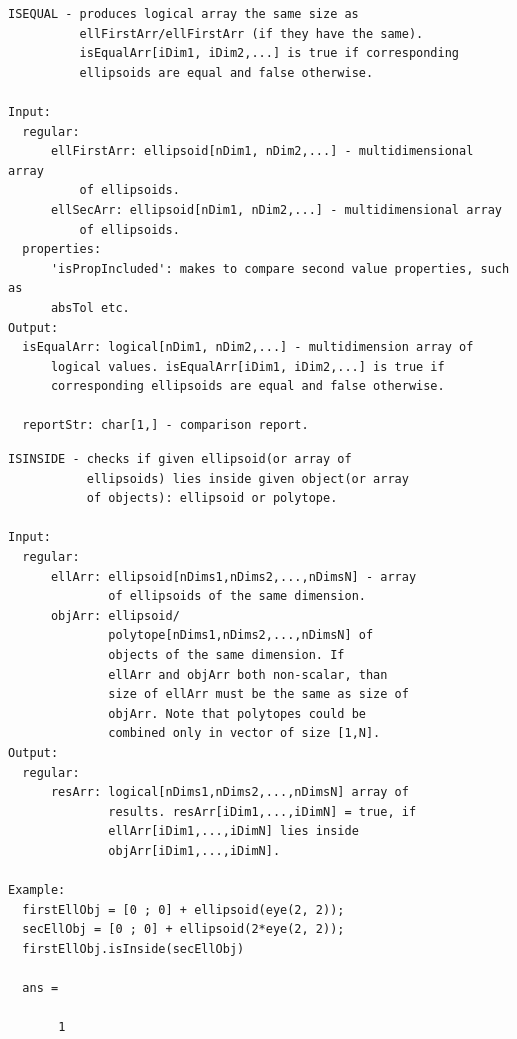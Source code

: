 \documentclass[letterpaper,10pt,english]{sphinxmanual}
\begin{document}
\begin{Verbatim}[commandchars=\\\{\}]
ISEQUAL - produces logical array the same size as
          ellFirstArr/ellFirstArr (if they have the same).
          isEqualArr[iDim1, iDim2,...] is true if corresponding
          ellipsoids are equal and false otherwise.

Input:
  regular:
      ellFirstArr: ellipsoid[nDim1, nDim2,...] - multidimensional array
          of ellipsoids.
      ellSecArr: ellipsoid[nDim1, nDim2,...] - multidimensional array
          of ellipsoids.
  properties:
      'isPropIncluded': makes to compare second value properties, such as
      absTol etc.
Output:
  isEqualArr: logical[nDim1, nDim2,...] - multidimension array of
      logical values. isEqualArr[iDim1, iDim2,...] is true if
      corresponding ellipsoids are equal and false otherwise.

  reportStr: char[1,] - comparison report.
\end{Verbatim}

\begin{Verbatim}[commandchars=\\\{\}]
ISINSIDE - checks if given ellipsoid(or array of
           ellipsoids) lies inside given object(or array
           of objects): ellipsoid or polytope.

Input:
  regular:
      ellArr: ellipsoid[nDims1,nDims2,...,nDimsN] - array
              of ellipsoids of the same dimension.
      objArr: ellipsoid/
              polytope[nDims1,nDims2,...,nDimsN] of
              objects of the same dimension. If
              ellArr and objArr both non-scalar, than
              size of ellArr must be the same as size of
              objArr. Note that polytopes could be
              combined only in vector of size [1,N].
Output:
  regular:
      resArr: logical[nDims1,nDims2,...,nDimsN] array of
              results. resArr[iDim1,...,iDimN] = true, if
              ellArr[iDim1,...,iDimN] lies inside
              objArr[iDim1,...,iDimN].

Example:
  firstEllObj = [0 ; 0] + ellipsoid(eye(2, 2));
  secEllObj = [0 ; 0] + ellipsoid(2*eye(2, 2));
  firstEllObj.isInside(secEllObj)

  ans =

       1
\end{Verbatim}
\end{document}
